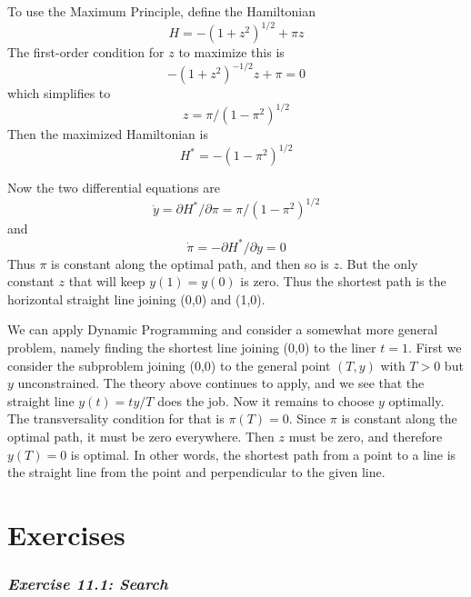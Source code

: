 To use the Maximum Principle, define the Hamiltonian
\begin{equation} \label{equa11.25}
  H = -(1+z^2)^{1/2} + \pi z
\end{equation}
The first-order condition for $z$ to maximize this is
\begin{equation*}
  -(1+z^2)^{-1/2}z + \pi = 0
\end{equation*}
which simplifies to
\begin{equation} \label{equa11.26}
   z = \pi / (1-\pi^2)^{1/2}
\end{equation}
Then the maximized Hamiltonian is 
\begin{equation} \label{equa11.27}
  H^* = -(1-\pi^2)^{1/2}
\end{equation}

Now the two differential equations are
\begin{equation} \label{equa11.28}
  \dot{y} = \partial H^* / \partial \pi = \pi / (1-\pi^2)^{1/2}
\end{equation}
and
\begin{equation} \label{equa11.29}
  \dot{\pi} = - \partial H^* / \partial y = 0
\end{equation}
Thus $\pi$ is constant along the optimal path, and then so is $z$. But the only constant $z$ that will keep $y(1) = y(0)$ is zero. Thus the shortest path is the horizontal straight line joining (0,0) and (1,0).

We can apply Dynamic Programming and consider a somewhat more general problem, namely finding the shortest line joining (0,0) to the liner $t= 1$. First we consider the subproblem joining (0,0) to the general point $(T, y)$ with $T > 0$ but $y$ unconstrained. The theory above continues to apply, and we see that the straight line $y(t) = ty/ T $ does the job. Now it remains to choose $y$ optimally. The transversality condition for that is $\pi(T) = 0$. Since $\pi$ is constant along the optimal path, it must be zero everywhere. Then $z$ must be zero, and therefore $y(T) = 0$ is optimal. In other words, the shortest path from a point to a line is the straight line from the point and perpendicular to the given line.

\section*{Exercises}

\subsubsection*{\textit{Exercise 11.1: Search}}

